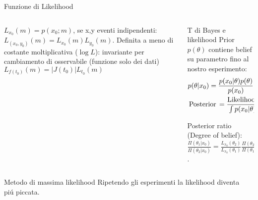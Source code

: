 \begin{frame}{Funzione di Likelihood}
\begin{columns}[T]
	\begin{column}{0.5\textwidth}
		$L_{x_0}(m)=p(x_0;m)$, se x,y eventi indipendenti: $L_{(x_0,y_0)}(m)=L_{x_0}(m)L_{y_0}(m)$. Definita a meno di costante moltiplicativa ($\log{L}$): invariante per cambiamento di osservabile (funzione solo dei dati)
		$L_{f(t_0)}(m)=|J(t_0)|L_{t_0}(m)$
	\end{column}
	\begin{column}{0.5\textwidth}
		\begin{block}{T di Bayes e likelihood}
			Prior $p(\theta)$ contiene belief su parametro fino al nostro esperimento:
			\begin{align*}
			&p(\theta|x_0)=\frac{p(x_0|\theta)p(\theta)}{p(x_0)}\\
			&\operatorname{Posterior}{}=\frac{\operatorname{Likelihood}{}\operatorname{Prior}{}}{\int p(x_0|\theta)p(\theta)\,d\theta}
			\end{align*}
			
			Posterior ratio (Degree of belief): $\frac{\Pi(\theta_1|x_0)}{\Pi(\theta_2|x_0)}=\frac{L_{x_0}(\theta_2)}{L_{x_0}(\theta_1)}\frac{\Pi(\theta_2)}{\Pi(\theta_1)}$.
		\end{block}
	\end{column}
\end{columns} 
\begin{columns}[T]
	\begin{column}{0.5\textwidth}
		\begin{block}{Metodo di massima likelihood}
			Ripetendo gli esperimenti la likelihood diventa pi\'u piccata.
		\end{block}
	\end{column}
	\begin{column}{0.5\textwidth}
		
	\end{column}
\end{columns}
\end{frame}

